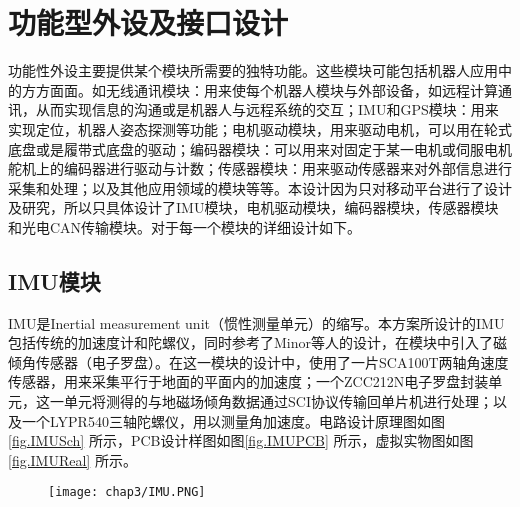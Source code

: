 \section{功能型外设及接口设计}
功能性外设主要提供某个模块所需要的独特功能。这些模块可能包括机器人应用中的方方面面。如无线通讯模块：用来使每个机器人模块与外部设备，如远程计算通讯，从而实现信息的沟通或是机器人与远程系统的交互；IMU和GPS模块：用来实现定位，机器人姿态探测等功能；电机驱动模块，用来驱动电机，可以用在轮式底盘或是履带式底盘的驱动；编码器模块：可以用来对固定于某一电机或伺服电机舵机上的编码器进行驱动与计数；传感器模块：用来驱动传感器来对外部信息进行采集和处理；以及其他应用领域的模块等等。本设计因为只对移动平台进行了设计及研究，所以只具体设计了IMU模块，电机驱动模块，编码器模块，传感器模块和光电CAN传输模块。对于每一个模块的详细设计如下。

\subsection{IMU模块}
IMU是Inertial measurement unit（惯性测量单元）的缩写。本方案所设计的IMU包括传统的加速度计和陀螺仪，同时参考了Minor等人的设计，在模块中引入了磁倾角传感器（电子罗盘）。在这一模块的设计中，使用了一片SCA100T两轴角速度传感器，用来采集平行于地面的平面内的加速度；一个ZCC212N电子罗盘封装单元，这一单元将测得的与地磁场倾角数据通过SCI协议传输回单片机进行处理；以及一个LYPR540三轴陀螺仪，用以测量角加速度。电路设计原理图如图\ref{fig.IMUSch} 所示，PCB设计样图如图\ref{fig.IMUPCB} 所示，虚拟实物图如图\ref{fig.IMUReal} 所示。 
\begin{figure}[!htp]
  \centering
  \texttt{[image: chap3/IMU.PNG]}
\end{figure}
\begin{figure}
  \centering
  \hspace{1in}
\end{figure}
\begin{figure}
  \centering
  \hspace{1in}
\end{figure}

